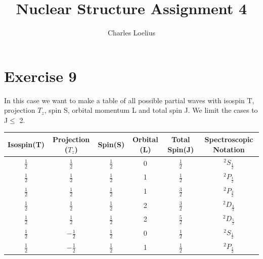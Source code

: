 \documentclass[11pt]{article} %
\title{Nuclear Structure Assignment 4}
\author{Charles Loelius}
\begin{document}
\maketitle

\section{Exercise 9}

In this case we want to make a table of all possible partial waves with isospin T, projection $T_z$, spin S, orbital momentum L and total spin J.  We limit the cases to J$\leq$ 2.

\begin{table}[hbt!]
\centering
\begin{tabular}{|c|c|c|c|c|c|}
 Isospin(T) & Projection ($T_z$) & Spin(S) & Orbital (L) & Total Spin(J)& Spectroscopic Notation\\
\hline
$\frac{1}{2}$ & $\frac{1}{2}$& $\frac{1}{2}$ & 0 &$ \frac{1}{2}$ & $^{2}S_{\frac{1}{2}}$\\

$\frac{1}{2}$ & $\frac{1}{2}$& $\frac{1}{2}$ & 1 &$ \frac{1}{2}$ & $^{2}P_{\frac{1}{2}}$\\

$\frac{1}{2}$ & $\frac{1}{2}$& $\frac{1}{2}$ & 1 &$ \frac{3}{2}$ & $^{2}P_{\frac{3}{2}}$\\
$\frac{1}{2}$ & $\frac{1}{2}$& $\frac{1}{2}$ & 2 &$ \frac{3}{2}$ & $^{2}D_{\frac{3}{2}}$\\
$\frac{1}{2}$ & $\frac{1}{2}$& $\frac{1}{2}$ & 2 &$ \frac{5}{2}$ & $^{2}D_{\frac{5}{2}}$\\
$\frac{1}{2}$ & $-\frac{1}{2}$& $\frac{1}{2}$ & 0 &$ \frac{1}{2}$ & $^{2}S_{\frac{1}{2}}$\\

$\frac{1}{2}$ & $-\frac{1}{2}$& $\frac{1}{2}$ & 1 &$ \frac{1}{2}$ & $^{2}P_{\frac{1}{2}}$\\


\end{tabular}
\end{table}
\end{document}
